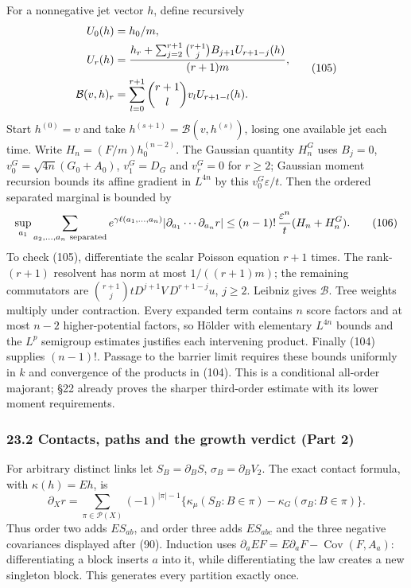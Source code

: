 \documentclass[11pt,a4paper]{article}
\begin{document}
For a nonnegative jet vector \(h\), define recursively
\[\begin{aligned}U_0(h)&=h_0/m,\\
U_r(h)&={h_r+\sum_{j=2}^{r+1}\binom{r+1}{j}B_{j+1}U_{r+1-j}(h)
\over(r+1)m},\\
\mathcal B(v,h)_r&=\sum_{l=0}^{r+1}\binom{r+1}{l}v_lU_{r+1-l}(h).
\end{aligned}\tag{105}\] Start \(h^{(0)}=v\) and take
\(h^{(s+1)}=\mathcal B(v,h^{(s)})\), losing one available jet each time.
Write \(H_n=(F/m)h^{(n-2)}_0\). The Gaussian quantity \(H_n^G\) uses
\(B_j=0\), \(v_0^G=\sqrt{4n}(G_0+A_0)\), \(v_1^G=D_G\) and \(v_r^G=0\)
for \(r\ge2\); Gaussian moment recursion bounds its affine gradient in
\(L^{4n}\) by this \(v_0^G\varepsilon/t\). Then the ordered separated
marginal is bounded by
\[\sup_{a_1}\sum_{a_2,\ldots,a_n\ {\rm separated}}
 e^{\gamma\ell(a_1,\ldots,a_n)}|\partial_{a_1}\cdots\partial_{a_n}r|
\le (n-1)!\,{\varepsilon^n\over t}(H_n+H_n^G).\tag{106}\] To check
(105), differentiate the scalar Poisson equation \(r+1\) times. The
rank-\((r+1)\) resolvent has norm at most \(1/((r+1)m)\); the remaining
commutators are \(\binom{r+1}{j}tD^{j+1}V\,D^{r+1-j}u\), \(j\ge2\).
Leibniz gives \(\mathcal B\). Tree weights multiply under contraction.
Every expanded term contains \(n\) score factors and at most \(n-2\)
higher-potential factors, so Hölder with elementary \(L^{4n}\) bounds
and the \(L^p\) semigroup estimates justifies each intervening product.
Finally (104) supplies \((n-1)!\). Passage to the barrier limit requires
these bounds uniformly in \(k\) and convergence of the products in
(104). This is a conditional all-order majorant; §22 already proves the
sharper third-order estimate with its lower moment requirements.

\hypertarget{contacts-paths-and-the-growth-verdict-part-2}{%
\subsubsection{23.2 Contacts, paths and the growth verdict (Part
2)}\label{contacts-paths-and-the-growth-verdict-part-2}}

For arbitrary distinct links let \(S_B=\partial_BS\),
\(\sigma_B=\partial_BV_2\). The exact contact formula, with
\(\kappa(h)=Eh\), is
\[\partial_Xr=\sum_{\pi\in\mathcal P(X)}(-1)^{|\pi|-1}
 \{\kappa_\mu(S_B:B\in\pi)-\kappa_G(\sigma_B:B\in\pi)\}.\tag{107}\] Thus
order two adds \(ES_{ab}\), and order three adds \(ES_{abc}\) and the
three negative covariances displayed after (90). Induction uses
\(\partial_a EF=E\partial_aF-\operatorname{Cov}(F,A_a)\):
differentiating a block inserts \(a\) into it, while differentiating the
law creates a new singleton block. This generates every partition
exactly once.
\end{document}

